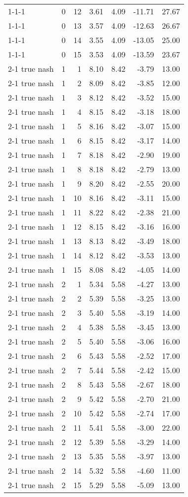 \begin{tabular}{lrrrrrr}
1-1-1 & 0 & 12 & 3.61 & 4.09 & -11.71 & 27.67 \\
1-1-1 & 0 & 13 & 3.57 & 4.09 & -12.63 & 26.67 \\
1-1-1 & 0 & 14 & 3.55 & 4.09 & -13.05 & 25.00 \\
1-1-1 & 0 & 15 & 3.53 & 4.09 & -13.59 & 23.67 \\
2-1  true nash & 1 & 1 & 8.10 & 8.42 & -3.79 & 13.00 \\
2-1  true nash & 1 & 2 & 8.09 & 8.42 & -3.85 & 12.00 \\
2-1  true nash & 1 & 3 & 8.12 & 8.42 & -3.52 & 15.00 \\
2-1  true nash & 1 & 4 & 8.15 & 8.42 & -3.18 & 18.00 \\
2-1  true nash & 1 & 5 & 8.16 & 8.42 & -3.07 & 15.00 \\
2-1  true nash & 1 & 6 & 8.15 & 8.42 & -3.17 & 14.00 \\
2-1  true nash & 1 & 7 & 8.18 & 8.42 & -2.90 & 19.00 \\
2-1  true nash & 1 & 8 & 8.18 & 8.42 & -2.79 & 13.00 \\
2-1  true nash & 1 & 9 & 8.20 & 8.42 & -2.55 & 20.00 \\
2-1  true nash & 1 & 10 & 8.16 & 8.42 & -3.11 & 15.00 \\
2-1  true nash & 1 & 11 & 8.22 & 8.42 & -2.38 & 21.00 \\
2-1  true nash & 1 & 12 & 8.15 & 8.42 & -3.16 & 16.00 \\
2-1  true nash & 1 & 13 & 8.13 & 8.42 & -3.49 & 18.00 \\
2-1  true nash & 1 & 14 & 8.12 & 8.42 & -3.53 & 13.00 \\
2-1  true nash & 1 & 15 & 8.08 & 8.42 & -4.05 & 14.00 \\
2-1  true nash & 2 & 1 & 5.34 & 5.58 & -4.27 & 13.00 \\
2-1  true nash & 2 & 2 & 5.39 & 5.58 & -3.25 & 13.00 \\
2-1  true nash & 2 & 3 & 5.40 & 5.58 & -3.19 & 14.00 \\
2-1  true nash & 2 & 4 & 5.38 & 5.58 & -3.45 & 13.00 \\
2-1  true nash & 2 & 5 & 5.40 & 5.58 & -3.06 & 16.00 \\
2-1  true nash & 2 & 6 & 5.43 & 5.58 & -2.52 & 17.00 \\
2-1  true nash & 2 & 7 & 5.44 & 5.58 & -2.42 & 15.00 \\
2-1  true nash & 2 & 8 & 5.43 & 5.58 & -2.67 & 18.00 \\
2-1  true nash & 2 & 9 & 5.42 & 5.58 & -2.70 & 21.00 \\
2-1  true nash & 2 & 10 & 5.42 & 5.58 & -2.74 & 17.00 \\
2-1  true nash & 2 & 11 & 5.41 & 5.58 & -3.00 & 22.00 \\
2-1  true nash & 2 & 12 & 5.39 & 5.58 & -3.29 & 14.00 \\
2-1  true nash & 2 & 13 & 5.35 & 5.58 & -3.97 & 13.00 \\
2-1  true nash & 2 & 14 & 5.32 & 5.58 & -4.60 & 11.00 \\
2-1  true nash & 2 & 15 & 5.29 & 5.58 & -5.09 & 13.00 \\
\bottomrule
\end{tabular}
